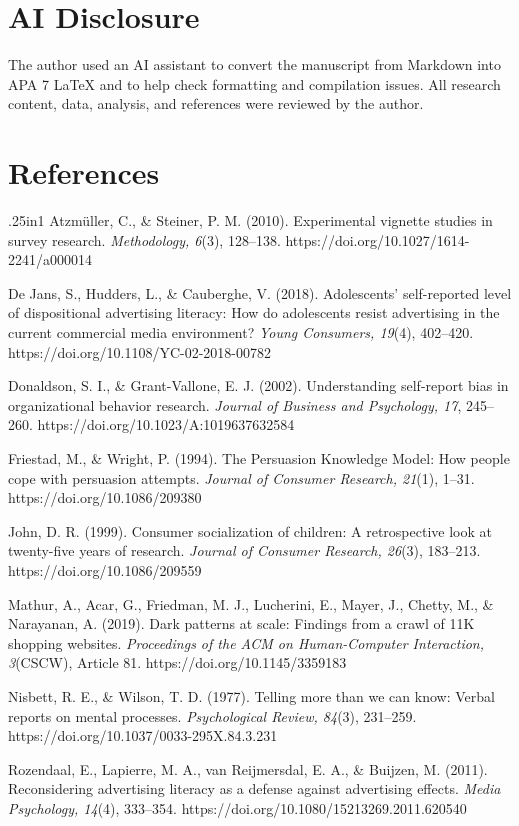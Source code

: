 \documentclass[stu,12pt,floatsintext]{apa7}
\begin{document}
\section{AI Disclosure}

The author used an AI assistant to convert the manuscript from Markdown into APA 7 LaTeX and to help check formatting and compilation issues. All research content, data, analysis, and references were reviewed by the author.


\section{References}
\begin{hangparas}{.25in}{1}
Atzmüller, C., \& Steiner, P. M. (2010). Experimental vignette studies in survey research. \textit{Methodology, 6}(3), 128--138. https://doi.org/10.1027/1614-2241/a000014

De Jans, S., Hudders, L., \& Cauberghe, V. (2018). Adolescents' self-reported level of dispositional advertising literacy: How do adolescents resist advertising in the current commercial media environment? \textit{Young Consumers, 19}(4), 402--420. https://doi.org/10.1108/YC-02-2018-00782

Donaldson, S. I., \& Grant-Vallone, E. J. (2002). Understanding self-report bias in organizational behavior research. \textit{Journal of Business and Psychology, 17}, 245--260. https://doi.org/10.1023/A:1019637632584

Friestad, M., \& Wright, P. (1994). The Persuasion Knowledge Model: How people cope with persuasion attempts. \textit{Journal of Consumer Research, 21}(1), 1--31. https://doi.org/10.1086/209380

John, D. R. (1999). Consumer socialization of children: A retrospective look at twenty-five years of research. \textit{Journal of Consumer Research, 26}(3), 183--213. https://doi.org/10.1086/209559

Mathur, A., Acar, G., Friedman, M. J., Lucherini, E., Mayer, J., Chetty, M., \& Narayanan, A. (2019). Dark patterns at scale: Findings from a crawl of 11K shopping websites. \textit{Proceedings of the ACM on Human-Computer Interaction, 3}(CSCW), Article 81. https://doi.org/10.1145/3359183

Nisbett, R. E., \& Wilson, T. D. (1977). Telling more than we can know: Verbal reports on mental processes. \textit{Psychological Review, 84}(3), 231--259. https://doi.org/10.1037/0033-295X.84.3.231

Rozendaal, E., Lapierre, M. A., van Reijmersdal, E. A., \& Buijzen, M. (2011). Reconsidering advertising literacy as a defense against advertising effects. \textit{Media Psychology, 14}(4), 333--354. https://doi.org/10.1080/15213269.2011.620540


\end{hangparas}
\end{document}
